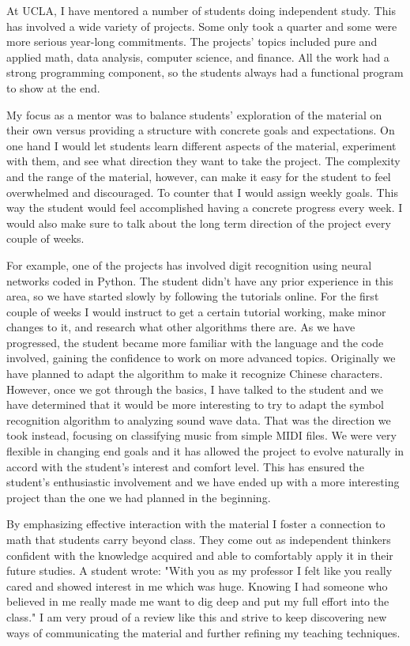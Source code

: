 \documentclass[11pt]{article}
\begin{document}
At UCLA, I have mentored a number of students doing independent study.
This has involved a wide variety of projects.
Some only took a quarter and some were more serious year-long commitments.
The projects' topics included pure and applied math, data analysis, computer science, and finance.
All the work had a strong programming component, so the students always had a functional program to show at the end.

My focus as a mentor was to balance students' exploration of the material on their own versus providing a structure with concrete goals and expectations.
On one hand I would let students learn different aspects of the material, experiment with them, and see what direction they want to take the project.
The complexity and the range of the material, however, can make it easy for the student to feel overwhelmed and discouraged.
To counter that I would assign weekly goals.
This way the student would feel accomplished having a concrete progress every week.
I would also make sure to talk about the long term direction of the project every couple of weeks.

For example, one of the projects has involved digit recognition using neural networks coded in Python.
The student didn't have any prior experience in this area, so we have started slowly by following the tutorials online.
For the first couple of weeks I would instruct to get a certain tutorial working, make minor changes to it, and research what other algorithms there are.
As we have progressed, the student became more familiar with the language and the code involved, gaining the confidence to work on more advanced topics.
Originally we have planned to adapt the algorithm to make it recognize Chinese characters.
However, once we got through the basics, I have talked to the student and we have determined that it would be more interesting to try to adapt the symbol recognition algorithm to analyzing sound wave data.
That was the direction we took instead, focusing on classifying music from simple MIDI files.
We were very flexible in changing end goals and it has allowed the project to evolve naturally in accord with the student's interest and comfort level.
This has ensured the student's enthusiastic involvement and we have ended up with a more interesting project than the one we had planned in the beginning.

By emphasizing effective interaction with the material I foster a connection to math that students carry beyond class.
They come out as independent thinkers confident with the knowledge acquired and able to comfortably apply it in their future studies.
A student wrote: "With you as my professor I felt like you really cared and showed interest in me which was huge.
Knowing I had someone who believed in me really made me want to dig deep and put my full effort into the class."
I am very proud of a review like this and strive to keep discovering new ways of communicating the material and further refining my teaching techniques.
\end{document}
